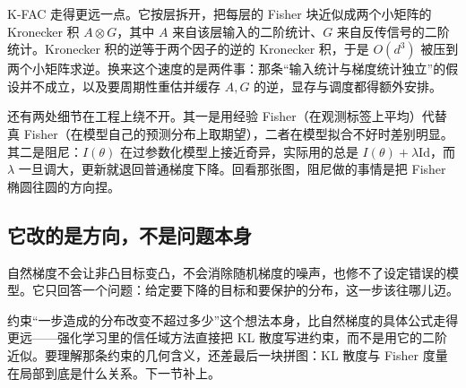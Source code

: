 K-FAC 走得更远一点。它按层拆开，把每层的 Fisher 块近似成两个小矩阵的 Kronecker 积 \(A\otimes G\)，其中 \(A\) 来自该层输入的二阶统计、\(G\) 来自反传信号的二阶统计。Kronecker 积的逆等于两个因子的逆的 Kronecker 积，于是 \(O(d^3)\) 被压到两个小矩阵求逆。换来这个速度的是两件事：那条``输入统计与梯度统计独立''的假设并不成立，以及要周期性重估并缓存 \(A,G\) 的逆，显存与调度都得额外安排。

还有两处细节在工程上绕不开。其一是用经验 Fisher（在观测标签上平均）代替真 Fisher（在模型自己的预测分布上取期望），二者在模型拟合不好时差别明显。其二是阻尼：\(I(\theta)\) 在过参数化模型上接近奇异，实际用的总是 \(I(\theta)+\lambda \mathrm{Id}\)，而 \(\lambda\) 一旦调大，更新就退回普通梯度下降。回看那张图，阻尼做的事情是把 Fisher 椭圆往圆的方向捏。

\subsection{它改的是方向，不是问题本身}

自然梯度不会让非凸目标变凸，不会消除随机梯度的噪声，也修不了设定错误的模型。它只回答一个问题：给定要下降的目标和要保护的分布，这一步该往哪儿迈。

约束``一步造成的分布改变不超过多少''这个想法本身，比自然梯度的具体公式走得更远——强化学习里的信任域方法直接把 KL 散度写进约束，而不是用它的二阶近似。要理解那条约束的几何含义，还差最后一块拼图：KL 散度与 Fisher 度量在局部到底是什么关系。下一节补上。
